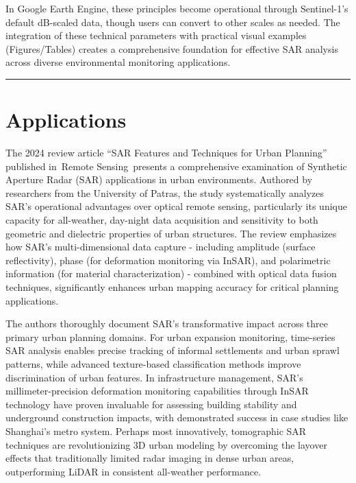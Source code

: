 \documentclass[
  letterpaper,
  DIV=11,
  numbers=noendperiod]{scrreprt}
\begin{document}
In Google Earth Engine, these principles become operational through
Sentinel-1's default dB-scaled data, though users can convert to other
scales as needed. The integration of these technical parameters with
practical visual examples (Figures/Tables) creates a comprehensive
foundation for effective SAR analysis across diverse environmental
monitoring applications.

\begin{center}\rule{0.5\linewidth}{0.5pt}\end{center}

\section{Applications}\label{applications-5}

The 2024 review article ``SAR Features and Techniques for Urban
Planning'' published in~Remote Sensing~presents a comprehensive
examination of Synthetic Aperture Radar (SAR) applications in urban
environments. Authored by researchers from the University of Patras, the
study systematically analyzes SAR's operational advantages over optical
remote sensing, particularly its unique capacity for all-weather,
day-night data acquisition and sensitivity to both geometric and
dielectric properties of urban structures. The review emphasizes how
SAR's multi-dimensional data capture - including amplitude (surface
reflectivity), phase (for deformation monitoring via InSAR), and
polarimetric information (for material characterization) - combined with
optical data fusion techniques, significantly enhances urban mapping
accuracy for critical planning applications.

The authors thoroughly document SAR's transformative impact across three
primary urban planning domains. For urban expansion monitoring,
time-series SAR analysis enables precise tracking of informal
settlements and urban sprawl patterns, while advanced texture-based
classification methods improve discrimination of urban features. In
infrastructure management, SAR's millimeter-precision deformation
monitoring capabilities through InSAR technology have proven invaluable
for assessing building stability and underground construction impacts,
with demonstrated success in case studies like Shanghai's metro system.
Perhaps most innovatively, tomographic SAR techniques are
revolutionizing 3D urban modeling by overcoming the layover effects that
traditionally limited radar imaging in dense urban areas, outperforming
LiDAR in consistent all-weather performance.
\end{document}
